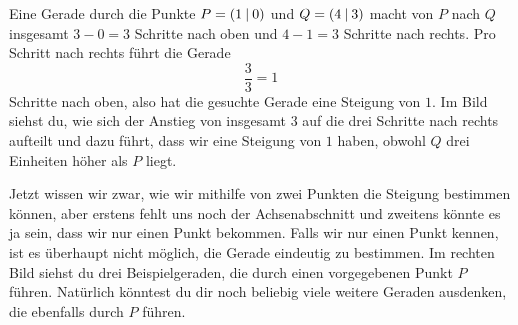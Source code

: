 \documentclass[../../main.tex]{subfiles}
\begin{document}
\begin{example}{}
    Eine Gerade durch die Punkte $P=\left(1 \:\middle|\: 0\right)$ und $Q=\left(4 \:\middle|\: 3\right)$ macht von $P$ nach $Q$ insgesamt $3-0=3$ Schritte nach oben und $4-1=3$ Schritte nach rechts. Pro Schritt nach rechts führt die Gerade
    \[\frac{3}{3}=1\]
    Schritte nach oben, also hat die gesuchte Gerade eine Steigung von $1$. Im Bild siehst du, wie sich der Anstieg von insgesamt $3$ auf die drei Schritte nach rechts aufteilt und dazu führt, dass wir eine Steigung von $1$ haben, obwohl $Q$ drei Einheiten höher als $P$ liegt.
\end{example}

Jetzt wissen wir zwar, wie wir mithilfe von zwei Punkten die Steigung bestimmen können, aber erstens fehlt uns noch der Achsenabschnitt und zweitens könnte es ja sein, dass wir nur einen Punkt bekommen. Falls wir nur einen Punkt kennen, ist es überhaupt nicht möglich, die Gerade eindeutig zu bestimmen. Im rechten Bild siehst du drei Beispielgeraden, die durch einen vorgegebenen Punkt $P$ führen. Natürlich könntest du dir noch beliebig viele weitere Geraden ausdenken, die ebenfalls durch $P$ führen.
\end{document}
